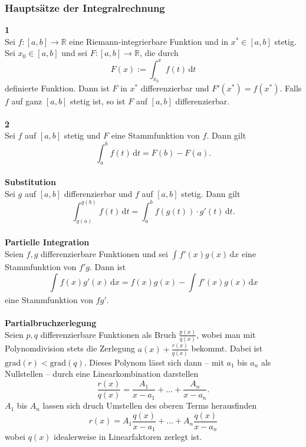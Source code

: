 \documentclass[a4paper,12pt]{article}
\newcommand{\td}{\,\text{d}}
\begin{document}
\subsubsection{Hauptsätze der Integralrechnung}
\textbf{1}\\ 
Sei $f:[a,b]\rightarrow \mathbb{R}$ eine Riemann-integrierbare Funktion und in $x^* \in [a,b]$ stetig. Sei $x_0 \in [a,b]$ und sei $F:[a,b]\rightarrow \mathbb{R}$, die durch
\[ 
        F\left(x\right):=\int_{x_0}^{x}f\left(t\right)\td t
\] 
definierte Funktion. Dann ist $F$ in $x^*$ differenzierbar und $F'\left(x^*\right)=f\left(x^*\right)$. Falls $f$ auf ganz $[a,b]$ stetig ist, so ist $F$ auf $[a,b]$ differenzierbar.
\\\hfill\\\textbf{2}\\ 
Sei $f$ auf $[a,b]$ stetig und $F$ eine Stammfunktion von $f$. Dann gilt
\[ 
        \int_{a}^{b}f\left(t\right)\td t=F\left(b\right)-F\left(a\right)
.\] 
\hfill\\\textbf{Substitution}\\ 
Sei $g$ auf $[a,b]$ differenzierbar und $f$ auf $[a,b]$ stetig. Dann gilt
\[ 
        \int_{g\left(a\right)}^{g\left(b\right)}f\left(t\right)\td t=\int_{a}^{b}f\left(g\left(t\right)\right)\cdot g'\left(t\right)\td t
.\] 
\hfill\\\textbf{Partielle Integration}\\ 
Seien $f,g$ differenzierbare Funktionen und sei $\int_{}^{}f'\left(x\right)g\left(x\right)\td x$ eine Stammfunktion von $f'g$. Dann ist
\[ 
        \int_{}^{}f\left(x\right)g'\left(x\right)\td x=f\left(x\right)g\left(x\right)-\int_{}^{}f'\left(x\right)g\left(x\right)\td x
\] 
eine Stammfunktion von $fg'$.
\\\hfill\\\textbf{Partialbruchzerlegung}\\ 
Seien $p,q$ differenzierbare Funktionen als Bruch $\tfrac{p\left(x\right)}{q\left(x\right)}$, wobei man mit Polynomdivision stets die Zerlegung $a\left(x\right)+\tfrac{r\left(x\right)}{q\left(x\right)}$ bekommt. Dabei ist $\text{grad}\left(r\right)<\text{grad}\left(q\right)$. Dieses Polynom lässt sich dann -- mit $a_1$ bis $a_n$ als Nullstellen -- durch eine Linearkombination darstellen
\[ 
        \dfrac{r\left(x\right)}{q\left(x\right)}=\dfrac{A_1}{x-a_1}+\hdots +\dfrac{A_n}{x-a_n}
.\] 
$A_1$ bis $A_n$ lassen sich druch Umstellen des oberen Terms herausfinden
\[ 
        r\left(x\right)=A_1\dfrac{q\left(x\right)}{x-a_1}+\hdots +A_n\dfrac{q\left(x\right)}{x-a_n}
\] 
wobei $q\left(x\right)$ idealerweise in Linearfaktoren zerlegt ist.\\
\end{document}
